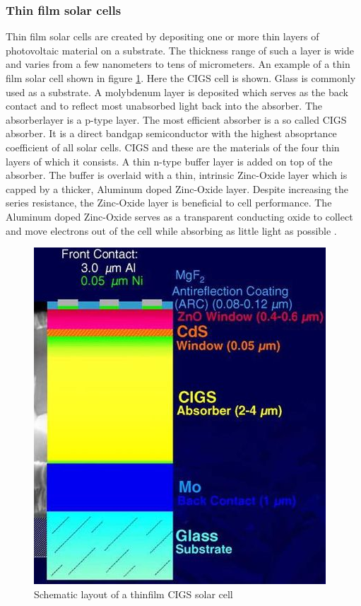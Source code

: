 \clearpage
\subsubsection{Thin film solar cells}
Thin film solar cells are created by depositing one or more thin layers of photovoltaic material on a substrate. The thickness range of such a layer is wide and varies from a few nanometers to tens of micrometers. An example of a thin film solar cell shown in figure 
\ref{fig:thinfilm_cell}. Here the \ac{CIGS} cell is shown. Glass is commonly used as a substrate. A molybdenum layer is deposited which serves as the back contact and to reflect most unabsorbed light back into the absorber. The absorberlayer is a p-type layer. The most efficient absorber is a so called \ac{CIGS} absorber. It is a direct bandgap semiconductor with the highest absoprtance coefficient of all solar cells. \ac{CIGS} and these are the materials of the four thin layers of which it consists. A thin n-type buffer layer is added on top of the absorber. The buffer is overlaid with a thin, intrinsic Zinc-Oxide layer which is capped by a thicker, Aluminum doped Zinc-Oxide layer. Despite increasing the series resistance, the Zinc-Oxide layer is beneficial to cell performance. The Aluminum doped Zinc-Oxide serves as a transparent conducting oxide to collect and move electrons out of the cell while absorbing as little light as possible \cite{dhere}.

\begin{figure}
\includegraphics{chapters/img/thinfilm_solar_cell.png}
\caption{Schematic layout of a thinfilm CIGS solar cell}
\label{fig:thinfilm_cell}
\end{figure}

